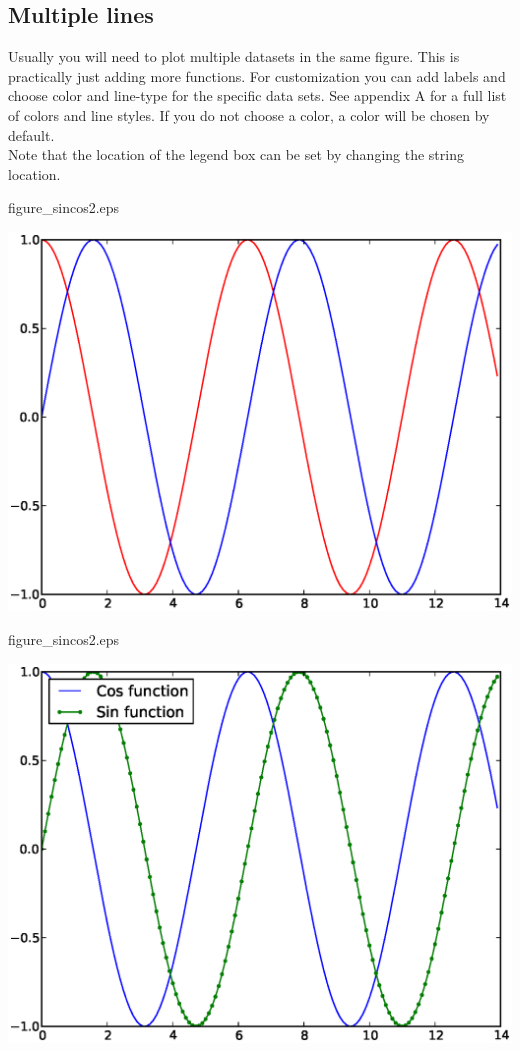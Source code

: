 \documentclass{article}
\begin{document}
\newpage
\subsection{Multiple lines}

Usually you will need to plot multiple datasets in the same figure.
This is practically just adding more  functions.
For customization you can add labels and choose color and line-type for the specific data sets.
See appendix A for a full list of colors and line styles.
If you do not choose a color, a color will be chosen by default.\\

Note that the location of the legend box can be set by changing the string location.

\begin{multicols}{2}

    

\columnbreak

    \centering

    figure\_sincos2.eps

    \includegraphics[width=1.0\linewidth]{py/figure_sincos1.eps}

    figure\_sincos2.eps

    \includegraphics[width=1.0\linewidth]{py/figure_sincos2.eps}


\end{multicols}
\end{document}
